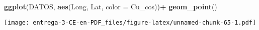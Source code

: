 \documentclass[
]{article}
\newenvironment{Shaded}{\begin{snugshade}}{\end{snugshade}}
\newcommand{\DataTypeTok}[1]{\textcolor[rgb]{0.13,0.29,0.53}{#1}}
\newcommand{\DecValTok}[1]{\textcolor[rgb]{0.00,0.00,0.81}{#1}}
\newcommand{\KeywordTok}[1]{\textcolor[rgb]{0.13,0.29,0.53}{\textbf{#1}}}
\newcommand{\NormalTok}[1]{#1}
\newcommand{\OperatorTok}[1]{\textcolor[rgb]{0.81,0.36,0.00}{\textbf{#1}}}
\newcommand{\StringTok}[1]{\textcolor[rgb]{0.31,0.60,0.02}{#1}}
\begin{document}
\begin{Shaded}
\begin{Highlighting}[]
\KeywordTok{ggplot}\NormalTok{(DATOS, }\KeywordTok{aes}\NormalTok{(Long, Lat, }\DataTypeTok{color =}\NormalTok{ Cu_cos))}\OperatorTok{+}
\StringTok{  }\KeywordTok{geom_point}\NormalTok{()}
\end{Highlighting}
\end{Shaded}

\texttt{[image: entrega-3-CE-en-PDF\_files/figure-latex/unnamed-chunk-65-1.pdf]}

\begin{Shaded}
\end{Shaded}
\end{document}
